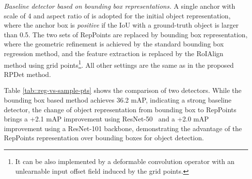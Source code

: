 \documentclass[10pt,twocolumn,letterpaper]{article}
\begin{document}
\noindent \emph{Baseline detector based on bounding box representations.} A single anchor with scale of 4 and aspect ratio of  is adopted for the initial object representation, where the anchor box is \emph{positive} if the IoU with a ground-truth object is larger than 0.5. The two sets of RepPoints are replaced by bounding box representation, where the geometric refinement is achieved by the standard bounding box regression method, and the feature extraction is replaced by the RoIAlign~\cite{Mask-rcnn} method using  grid points\footnote{It can be also implemented by a deformable convolution operator with an unlearnable input offset field induced by the  grid points.}. All other settings are the same as in the proposed RPDet method.

Table \ref{tab::reg-vs-sample-pts} shows the comparison of two detectors. While the bounding box based method achieves 36.2 mAP, indicating a strong baseline detector, the change of object representation from bounding box to RepPoints brings a +2.1 mAP improvement using ResNet-50~\cite{ResNet} and a +2.0 mAP improvement using a ResNet-101 \cite{ResNet} backbone, demonstrating the advantage of the RepPoints representation over bounding boxes for object detection.
\end{document}
